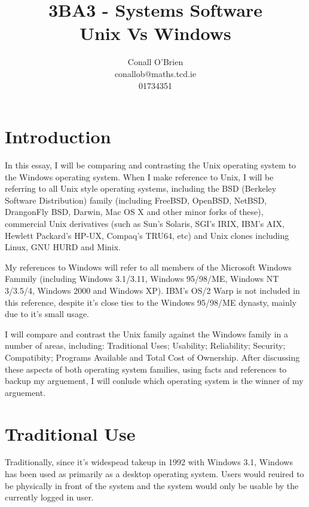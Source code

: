 \documentclass[a4paper,10pt]{article}
\begin{document}
\title{3BA3 - Systems Software \\ Unix Vs Windows}

\author{Conall O'Brien \\ conallob@maths.tcd.ie \\ 01734351 }

\maketitle

\section*{Introduction}

In this essay, I will be comparing and contrasting the Unix operating
system to the Windows operating system. When I make reference to Unix, I
will be referring to all Unix style operating systems, including the BSD
(Berkeley Software Distribution) family (including FreeBSD, OpenBSD,
NetBSD, DrangonFly BSD, Darwin, Mac OS X and other minor forks of
these), commercial Unix derivatives (such as Sun's Solaris, SGI's IRIX,
IBM's AIX, Hewlett Packard's HP-UX, Compaq's TRU64, etc) and Unix
clones including Linux, GNU HURD and Minix.

My references to Windows will refer to all members of the Microsoft
Windows Fammily (including Windows 3.1/3.11, Windows 95/98/ME, Windows NT 
3/3.5/4, Windows 2000 and Windows XP). IBM's OS/2 Warp is not included
in this reference, despite it's close ties to the Windows 95/98/ME
dynasty, mainly due to it's small usage.

I will compare and contrast the Unix family against the Windows family
in a number of areas, including: Traditional Uses; Usability;
Reliability; Security; Compatibity; Programs Available and Total Cost of
Ownership. After discussing these aspects of both operating system 
families, using facts and references to backup my arguement, I will
conlude which operating system is the winner of my arguement.

\section*{Traditional Use}

Traditionally, since it's widespead takeup in 1992 with Windows 3.1,
Windows has been used as primarily as a desktop operating system. Users 
would reuired to be physically in front of the system and the system 
would only be usable by the currently logged in user.
\end{document}
